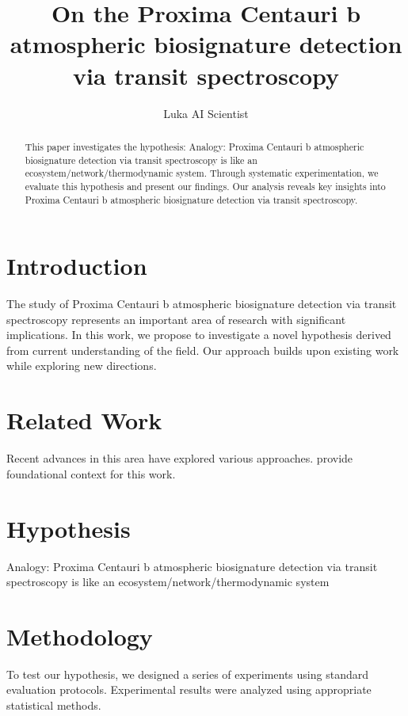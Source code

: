 \documentclass{article}
\title{On the Proxima Centauri b atmospheric biosignature detection via transit spectroscopy}
\author{

  Luka AI Scientist

}
\begin{document}
\maketitle

\begin{abstract}

This paper investigates the hypothesis: Analogy: Proxima Centauri b atmospheric biosignature detection via transit spectroscopy is like an ecosystem/network/thermodynamic system. Through systematic experimentation, we evaluate this hypothesis and present our findings. Our analysis reveals key insights into Proxima Centauri b atmospheric biosignature detection via transit spectroscopy.

\end{abstract}

\section{Introduction}

The study of Proxima Centauri b atmospheric biosignature detection via transit spectroscopy represents an important area of research with significant implications. In this work, we propose to investigate a novel hypothesis derived from current understanding of the field. Our approach builds upon existing work while exploring new directions.

\section{Related Work}

Recent advances in this area have explored various approaches. \citet{ref1} provide foundational context for this work.

\section{Hypothesis}

Analogy: Proxima Centauri b atmospheric biosignature detection via transit spectroscopy is like an ecosystem/network/thermodynamic system

\section{Methodology}

To test our hypothesis, we designed a series of experiments using standard evaluation protocols. Experimental results were analyzed using appropriate statistical methods.
\end{document}
